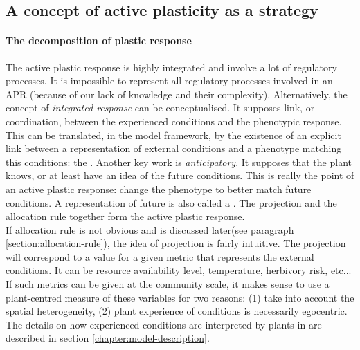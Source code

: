 \subsection{A concept of active plasticity as a strategy}
\paragraph{The decomposition of plastic response}
The active plastic response is highly integrated and involve a lot of regulatory processes. It is impossible to represent all regulatory processes involved in an APR (because of our lack of knowledge and their complexity). Alternatively, the concept of \textit{integrated response} can be conceptualised. It supposes link, or coordination, between the experienced conditions and the phenotypic response. This can be translated, in the model framework, by the existence of an explicit link between a representation of external conditions and a phenotype matching this conditions: the . Another key work is \textit{anticipatory}. It supposes that the plant knows, or at least have an idea of the future conditions. This is really the point of an active plastic response: change the phenotype to better match future conditions. A representation of future is also called a . The projection and the allocation rule together form the active plastic response.\\
If allocation rule is not obvious and is discussed later(see paragraph \ref{section:allocation-rule}), the idea of projection is fairly intuitive. The projection will correspond to a value for a given metric that represents the external conditions. It can be resource availability level, temperature, herbivory risk, etc... If such metrics can be given at the community scale, it makes sense to use a plant-centred measure of these variables for two reasons: (1) take into account the spatial heterogeneity, (2) plant experience of conditions is necessarily egocentric. The details on how experienced conditions are interpreted by plants in \model are described in section \ref{chapter:model-description}.

